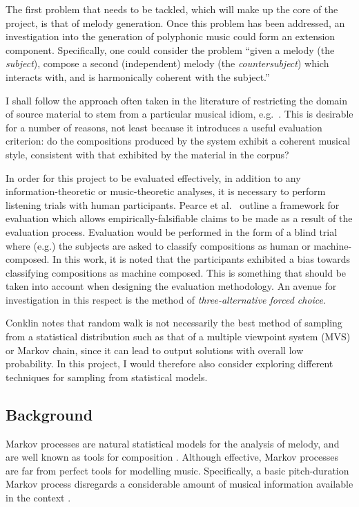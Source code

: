 \documentclass[12pt,a4paper,twoside]{article}
\begin{document}
The first problem that needs to be tackled, which will make up the core of the
project, is that of melody generation. Once this problem has been addressed, an
investigation into the generation of polyphonic music could form an extension
component. Specifically, one could consider the problem ``given a melody (the
\emph{subject}), compose a second (independent) melody (the
\emph{countersubject}) which interacts with, and is harmonically coherent with
the subject.'' 

I shall follow the approach often taken in the literature of restricting the
domain of source material to stem from a particular musical idiom, e.g.\
\cite{pearce2001evaluation}. This is desirable for a number of reasons, not
least because it introduces a useful evaluation criterion: do the compositions
produced by the system exhibit a coherent musical style, consistent with that
exhibited by the material in the corpus?

In order for this project to be evaluated effectively, in addition to any
information-theoretic or music-theoretic analyses, it is necessary to perform
listening trials with human participants. Pearce et al.\
\cite{pearce2001evaluation} outline a framework for evaluation which allows
empirically-falsifiable claims to be made as a result of the evaluation process.
Evaluation would be performed in the form of a blind trial where (e.g.) the
subjects are asked to classify compositions as human or machine-composed. In
this work, it is noted that the participants exhibited a bias towards
classifying compositions as machine composed. This is something that should be
taken into account when designing the evaluation methodology. An avenue for
investigation in this respect is the method of \emph{three-alternative forced
  choice}.

Conklin \cite{conklin2003music} notes that random walk is not necessarily the
best method of sampling from a statistical distribution such as that of a
multiple viewpoint system (MVS) or Markov chain, since it can lead to output
solutions with overall low probability. In this project, I would therefore also
consider exploring different techniques for sampling from statistical models.
 
\subsection{Background}

Markov processes are natural statistical models for the analysis of melody, and
are well known as tools for composition \cite{ames1989markov}. Although
effective, Markov processes are far from perfect tools for modelling music.
Specifically, a basic pitch-duration Markov process disregards a considerable
amount of musical information available in the context
\cite{conklin1995viewpoints}.  
\end{document}
